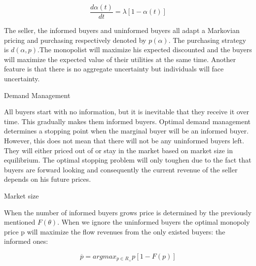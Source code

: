 \documentclass[12pt]{report}
\numberwithin{equation}{section}
\begin{document}
\begin{equation}
\frac{d \alpha (t)}{dt} = \lambda [1-\alpha (t)]
\end{equation}

The seller, the informed buyers and uninformed buyers all adapt a Markovian pricing and purchasing respectively denoted by $p(\alpha)$. The purchasing strategy is $d(\alpha,p)$.The monopolist will maximize his expected discounted and the buyers will maximize the expected value of their utilities at the same time. Another feature is that there is no aggregate uncertainty but individuals will face uncertainty.

Demand Management

All buyers start with no information, but it is inevitable that they receive it over time. This gradually makes them informed buyers. Optimal demand management determines a stopping point when the marginal buyer will be an informed buyer. However, this does not mean that there will not be any uninformed buyers left. They will either priced out of or stay in the market based on market size in equilibrium. The optimal stopping problem will only toughen due to the fact that buyers are forward looking and consequently the current revenue of the seller depends on his future prices.

Market size

When the number of informed buyers grows price is determined by the previously mentioned $F(\theta)$. When we ignore the uninformed buyers the optimal monopoly price p will maximize the flow revenues from the only existed buyers: the informed ones:

\begin{equation}
\overline{p} = argmax_{p \in R_+} {p[1-F(p)] }
\end{equation}
\end{document}
